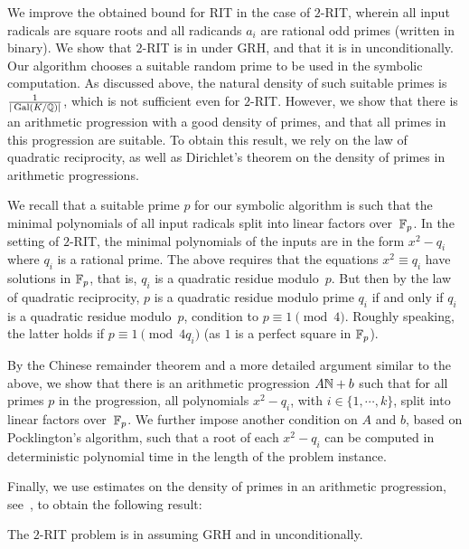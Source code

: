 \bigskip
{}
%
We improve the obtained {\coNP} bound for  RIT  in the case of $2$-RIT, wherein all input radicals are square roots and all radicands $a_i$ are 
rational odd primes
(written in binary).
We show that $2$-RIT is in {\coRP} under GRH, and that it is in {\coNP} unconditionally.
Our {\coRP} algorithm  chooses a suitable random prime to be used in the symbolic computation. 
As discussed above,  the natural density of such suitable primes is $\frac{1}{|\operatorname{Gal}(K/\mathbb{Q})|}$, which is not  sufficient even for $2$-RIT.  However, we show that there is an arithmetic progression with a good density of primes, and that all primes in this progression are suitable.
To obtain this result, we rely on the law of quadratic reciprocity, as well as Dirichlet’s theorem on the density of primes in arithmetic progressions. 


We recall that a suitable  prime $p$ for our symbolic algorithm  is  such that 
the minimal polynomials of all input radicals split into linear factors over~$\mathbb{F}_p$. In the setting of $2$-RIT, the minimal polynomials of the inputs are in the form $x^2-q_i$ where $q_i$ is a rational prime. The above requires that the equations $x^2 \equiv q_i$ have  solutions in $\mathbb{F}_p$, that is, $q_i$ is a quadratic residue modulo~$p$. 
%
But then by the law of quadratic reciprocity, $p$ is a quadratic residue modulo prime $q_i$ if and only if $q_i$ is a quadratic residue modulo~$p$, condition to  $p \equiv 1 \pmod{4}$. 
Roughly speaking, the latter holds if $p \equiv 1 \pmod{4q_i}$ (as $1$ is a perfect square in $\mathbb{F}_p$). 

By the Chinese remainder theorem and a more detailed argument similar to the above, 
we show 
that there is an arithmetic progression $A\mathbb{N}+b$ such that 
for all primes $p$ in the progression, all  polynomials 
$x^2-q_i$, with $i\in \{1,\cdots,k\}$, split into linear factors over~$\mathbb{F}_p$. 
We further impose another
condition on $A$
and $b$, based on Pocklington's algorithm, such that 
a root of each $x^2-q_i$ can be computed in deterministic polynomial time in the length of the problem instance.   

Finally, 
we use  estimates on the density of primes in an arithmetic
progression, see~, to obtain the following result:

\begin{theorem}\label{th:squareRIT-coRP}
The $2$-RIT problem is in {\coRP} assuming GRH and in {\coNP} unconditionally.
\end{theorem}

